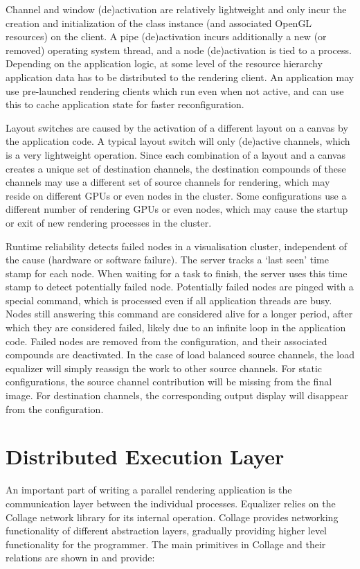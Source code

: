 Channel and window (de)activation are relatively lightweight and only incur the
creation and initialization of the class instance (and associated OpenGL
resources) on the client. A pipe (de)activation incurs additionally a new (or
removed) operating system thread, and a node (de)activation is tied to a
process. Depending on the application logic, at some level of the resource
hierarchy application data has to be distributed to the rendering client. An
application may use pre-launched rendering clients which run even when not
active, and can use this to cache application state for faster reconfiguration.

Layout switches are caused by the activation of a different layout on a canvas
by the application code. A typical layout switch will only (de)active channels,
which is a very lightweight operation. Since each combination of a layout and a
canvas creates a unique set of destination channels, the destination compounds
of these channels may use a different set of source channels for rendering,
which may reside on different GPUs or even nodes in the cluster. Some
configurations use a different number of rendering GPUs or even nodes, which
may cause the startup or exit of new rendering processes in the cluster.

Runtime reliability detects failed nodes in a visualisation cluster,
independent of the cause (hardware or software failure). The server tracks a
`last seen' time stamp for each node. When waiting for a task to finish, the
server uses this time stamp to detect potentially failed node. Potentially
failed nodes are pinged with a special command, which is processed even if all
application threads are busy. Nodes still answering this command are considered
alive for a longer period, after which they are considered failed, likely due
to an infinite loop in the application code. Failed nodes are removed from the
configuration, and their associated compounds are deactivated. In the case of
load balanced source channels, the load equalizer will simply reassign the work
to other source channels. For static configurations, the source channel
contribution will be missing from the final image. For destination channels,
the corresponding output display will disappear from the configuration.

\section{Distributed Execution Layer}

An important part of writing a parallel rendering application is the
communication layer between the individual processes. \textsf{Equalizer} relies
on the \textsf{Collage} network library for its internal operation.
\textsf{Collage} provides networking functionality of different abstraction
layers, gradually providing higher level functionality for the programmer. The
main primitives in \textsf{Collage} and their relations are shown in
 and provide:

